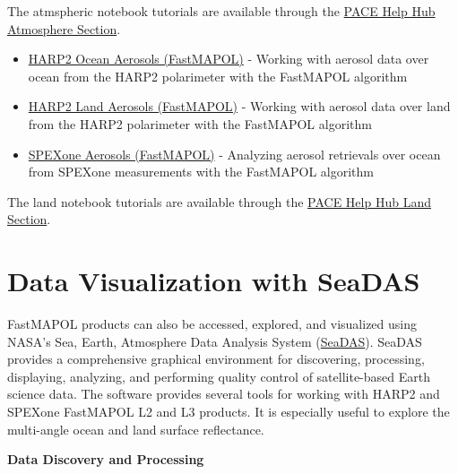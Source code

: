 \documentclass[
  11pt,
  letterpaper,
]{scrreprt}
\providecommand{\tightlist}{%
  \setlength{\itemsep}{0pt}\setlength{\parskip}{0pt}}
\begin{document}
The atmspheric notebook tutorials are available through the
\href{https://nasa.github.io/oceandata-notebooks/sections/cloud-atmosphere.html}{PACE
Help Hub Atmosphere Section}.

\begin{itemize}
\tightlist
\item
  \href{https://nasa.github.io/oceandata-notebooks/notebooks/harp2/harp2_l2_fastmapol_aerosol_ocean_product.html}{HARP2
  Ocean Aerosols (FastMAPOL)} - Working with aerosol data over ocean
  from the HARP2 polarimeter with the FastMAPOL algorithm
\item
  \href{https://nasa.github.io/oceandata-notebooks/notebooks/harp2/harp2_l2_fastmapol_aerosol_land_product.html}{HARP2
  Land Aerosols (FastMAPOL)} - Working with aerosol data over land from
  the HARP2 polarimeter with the FastMAPOL algorithm
\item
  \href{https://nasa.github.io/oceandata-notebooks/notebooks/spexone/spexone_l2_fastmapol_aerosol_product.html}{SPEXone
  Aerosols (FastMAPOL)} - Analyzing aerosol retrievals over ocean from
  SPEXone measurements with the FastMAPOL algorithm
\end{itemize}

The land notebook tutorials are available through the
\href{https://nasa.github.io/oceandata-notebooks/sections/land.html}{PACE
Help Hub Land Section}.


\chapter*{Data Visualization with
SeaDAS}\label{data-visualization-with-seadas}


FastMAPOL products can also be accessed, explored, and visualized using
NASA's Sea, Earth, Atmosphere Data Analysis System
(\href{https://www.earthdata.nasa.gov/data/tools/seadas}{SeaDAS}).
SeaDAS provides a comprehensive graphical environment for discovering,
processing, displaying, analyzing, and performing quality control of
satellite-based Earth science data. The software provides several tools
for working with HARP2 and SPEXone FastMAPOL L2 and L3 products. It is
especially useful to explore the multi-angle ocean and land surface
reflectance.

\textbf{Data Discovery and Processing}
\end{document}
